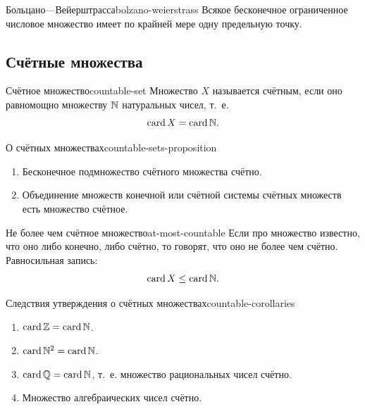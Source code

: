 \begin{lemma}{Больцано—Вейерштрасса}{bolzano-weierstrass}
  Всякое бесконечное ограниченное числовое множество имеет по крайней мере
  одну предельную точку.
\end{lemma}

\clearpage
{}

\subsection{Счётные множества}

\begin{definition}{Счётное множество}{countable-set}
  Множество $X$ называется счётным, если оно равномощно множеству $\mathbb{N}$
  натуральных чисел, т.~е.
  \[
    \operatorname{card} X=\operatorname{card}\mathbb{N}.
  \]
\end{definition}

\begin{proposition}{О счётных множествах}{countable-sets-proposition}
  \begin{enumerate}[label=\alph*)]
    \item Бесконечное подмножество счётного множества счётно.\par
    \item Объединение множеств конечной или счётной системы счётных множеств
      есть множество счётное.
  \end{enumerate}
\end{proposition}

\begin{definition}{Не более чем счётное множество}{at-most-countable}
  Если про множество известно, что оно либо конечно, либо счётно, то говорят,
  что оно не более чем счётно. Равносильная запись:
  \[
    \operatorname{card} X\le\operatorname{card}\mathbb{N}.
  \]
\end{definition}

\begin{corollary}{Следствия утверждения о счётных множествах}{countable-corollaries}
  \begin{enumerate}[label=\arabic*)]
    \item $\operatorname{card}\mathbb{Z}=\operatorname{card}\mathbb{N}$.\par
    \item $\operatorname{card}\mathbb{N}^2=\operatorname{card}\mathbb{N}$.\par
    \item $\operatorname{card}\mathbb{Q}=\operatorname{card}\mathbb{N}$, т.~е. множество рациональных чисел счётно.\par
    \item Множество алгебраических чисел счётно.
  \end{enumerate}
\end{corollary}

